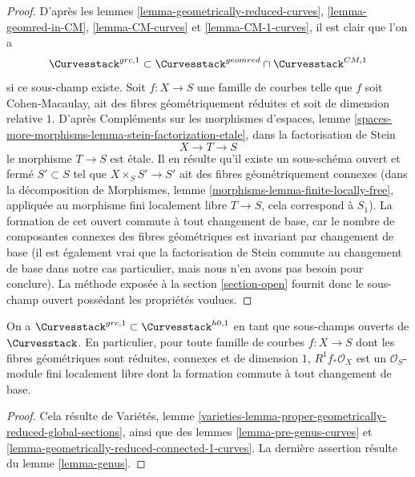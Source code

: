 \begin{proof}
D'après les lemmes \ref{lemma-geometrically-reduced-curves},
\ref{lemma-geomred-in-CM}, \ref{lemma-CM-curves} et \ref{lemma-CM-1-curves},
il est clair que l'on a
$$
\Curvesstack^{grc, 1}
\subset
\Curvesstack^{geomred} \cap \Curvesstack^{CM, 1}
$$
si ce sous-champ existe. Soit $f : X \to S$ une famille de courbes telle que $f$
soit Cohen-Macaulay, ait des fibres géométriquement réduites et
soit de dimension relative $1$. D'après
Compléments sur les morphismes d'espaces, lemme
\ref{spaces-more-morphisms-lemma-stein-factorization-etale},
dans la factorisation de Stein
$$
X \to T \to S
$$
le morphisme $T \to S$ est \'etale. Il en résulte qu'il existe
un sous-schéma ouvert et fermé $S' \subset S$ tel que
$X \times_S S' \to S'$ ait des fibres géométriquement
connexes (dans la décomposition de
Morphismes, lemme \ref{morphisms-lemma-finite-locally-free},
appliquée au morphisme fini localement libre $T \to S$,
cela correspond à $S_1$).
La formation de cet ouvert commute à tout changement de base,
car le nombre de composantes connexes des fibres géométriques
est invariant par changement de base (il est également vrai
que la factorisation de Stein commute au changement de base
dans notre cas particulier, mais nous n'en avons pas besoin pour conclure).
La méthode exposée à la section \ref{section-open} fournit donc le sous-champ
ouvert possédant les propriétés voulues.
\end{proof}

\begin{lemma}
\label{lemma-geomredcon-in-h0-1}
On a $\Curvesstack^{grc, 1} \subset \Curvesstack^{h0, 1}$
en tant que sous-champs ouverts de $\Curvesstack$. En particulier, pour toute
famille de courbes $f : X \to S$
dont les fibres géométriques sont réduites, connexes et de dimension $1$,
$R^1f_*\mathcal{O}_X$ est un $\mathcal{O}_S$-module fini localement libre
dont la formation commute à tout changement de base.
\end{lemma}

\begin{proof}
Cela résulte de Variétés, lemme
\ref{varieties-lemma-proper-geometrically-reduced-global-sections},
ainsi que des lemmes \ref{lemma-pre-genus-curves} et
\ref{lemma-geometrically-reduced-connected-1-curves}.
La dernière assertion résulte du lemme \ref{lemma-genus}.
\end{proof}


